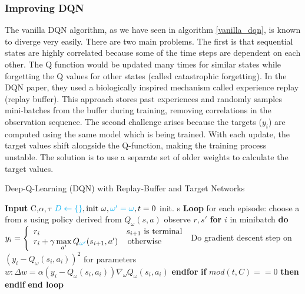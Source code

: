 \subsubsection{Improving DQN}
The vanilla DQN algorithm, as we have seen in algorithm \ref{vanilla_dqn}, is known to diverge 
very easily. There are two main problems. The first is that sequential states are 
highly correlated because some of the time steps are dependent on each other. The Q function would be 
updated many times for similar states while forgetting the Q values for other states 
(called catastrophic forgetting). In the DQN paper, they used a biologically 
inspired mechanism called experience replay (replay buffer). This approach stores past experiences and 
randomly samples mini-batches from the buffer during training, removing correlations in the observation sequence.\newline
The second challenge arises because the targets ($y_i$) are computed using the same model which is being trained. 
With each update, the target values shift alongside the Q-function, making the training process unstable. The solution is
to use a separate set of older weights to calculate the target values.

 \begin{algorithm}[H]
  \large
    \caption{Deep-Q-Learning (DQN) with Replay-Buffer and Target Networks \cite{mnih2013playingatarideepreinforcement}}\label{dqn}
    \begin{algorithmic}
    \STATE \textbf{Input} C,$\alpha,\tau$
    \STATE ${\color{cyan}D \gets \{\}}, \text{init } \omega, {\color{cyan}\omega'=\omega}, t = 0$
    \STATE init. s
    \STATE \textbf{Loop} for each episode:
    \STATE \quad choose a from s using policy derived from $Q_\omega(s,a)$
    \STATE \quad observe $r,s'$ 
    \STATE {}
    \STATE {}
    \STATE \quad \textbf{for} $i$ in minibatch \textbf{do} 
    \STATE \qquad $y_i = \left\{
\begin{array}{ll}
r_i & s_{i+1} \text{ is terminal} \\
r_i + \gamma \max\limits_{a'}Q_{\color{cyan}\omega'}(s_{i+1},a') & \, \textrm{otherwise} \\
\end{array}
\right. $
    \STATE \qquad Do gradient descent step on $(y_i- Q_\omega(s_i,a_i))^2$ for parameters
    \STATE \qquad  $w: \Delta w = \alpha (y_i -  Q_\omega(s_i,a_i))\nabla_\omega  Q_\omega(s_i,a_i) $
    \STATE \quad \textbf{endfor}
    \STATE \quad \textbf{if }$mod(t,C) == 0$ \textbf{then}
    \STATE {}
    \STATE \quad \textbf{endif}
    \STATE \textbf{end loop}
    \end{algorithmic}
\end{algorithm}

